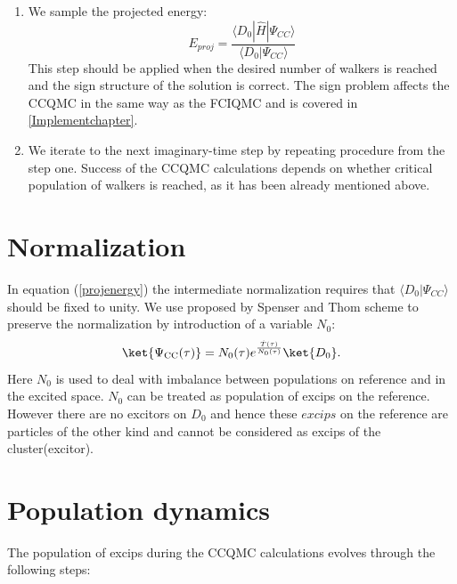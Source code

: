 \documentclass[twoside,english]{uiofysmaster}
\begin{document}
\begin{enumerate}
	\item We sample the projected energy: 
	\begin{equation}\label{projenergy}
		E_{proj} = \frac{\langle D_0|\hat{H}|\Psi_{CC} \rangle}{\langle D_0|\Psi_{CC} \rangle}
	\end{equation}
	This step should be applied when the desired number of walkers is reached and the sign structure of the solution is correct. The sign problem affects the CCQMC in the same way as the FCIQMC and is covered in \autoref{Implementchapter}.
	\item We iterate to the next imaginary-time step by repeating procedure from the step one. 
Success of the CCQMC calculations depends on whether critical population of walkers is reached, as it has been already mentioned above. 
\end{enumerate}

\section{Normalization}

In equation (\ref{projenergy}) the intermediate normalization requires that $\langle D_0|\Psi_{CC} \rangle$ should be fixed to unity. We use proposed by Spenser and Thom \cite{SpencerDevelopmentsstochasticcoupled2016} scheme to preserve the normalization by introduction of a variable $N_0$:
\begin{equation}\label{eq:exptauloop}
\ket{\Psi_{\text{CC}}(\tau)}=N_0(\tau) e^{\frac{\hat{T}(\tau)}{N_0(\tau)}} \ket{D_0}.
\end{equation}
Here $N_0$ is used to deal with imbalance between populations on reference and in the excited space. $N_0$ can be treated as population of excips on the reference. However there are no excitors on $D_0$ and hence these $excips$ on the reference are particles of the other kind and cannot be considered as excips of the cluster(excitor).   



\section{Population dynamics}

The population of excips during the CCQMC calculations evolves through the following steps: 
\end{document}
